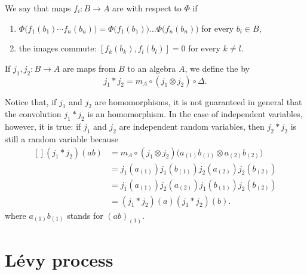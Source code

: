 \begin{definition}
	We say that maps $f_i\colon B\to A$ are  with respect to $\Phi$ if
	\begin{enumerate}
		\item
		      $\Phi\big( f_1(b_1)\cdots f_n(b_n) \big)=\Phi\big( f_1(b_1) \big)\ldots\Phi\big( f_n(b_n) \big)$ for every $b_i\in B$,
		\item
		      the images commute: $[f_k(b_k),f_l(b_l)]=0$ for every $k\neq l$.
	\end{enumerate}
\end{definition}

If $j_1,j_2\colon B\to A$ are maps from $B$ to an algebra $A$, we define the  by
\begin{equation}
	j_1*j_2=m_A\circ(j_1\otimes j_2)\circ\Delta.
\end{equation}

Notice that, if $j_1$ and $j_2$ are homomorphisms, it is not guaranteed in general that the convolution $j_1*j_2$ is an homomorphism. In the case of independent variables, however, it is true: if $j_1$ and $j_2$ are independent random variables, then $j_2*j_2$ is still a random variable because
\begin{equation}
	\begin{aligned}[]
		(j_1*j_2)(ab) & =m_A\circ(j_1\otimes j_2)\big( a_{(1)}b_{(1)}\otimes a_{(2)}b_{(2)} \big) \\
		              & =j_1(a_{(1)})j_1(b_{(1)})j_2(a_{(2)})j_2(b_{(2)})                         \\
		              & =j_1(a_{(1)})j_2(a_{(2)})j_1(b_{(1)})j_2(b_{(2)})                         \\
		              & =(j_1*j_2)(a)(j_1*j_2)(b).
	\end{aligned}
\end{equation}
where $a_{(1)}b_{(1)}$ stands for $(ab)_{(1)}$.

\section{Lévy process}

